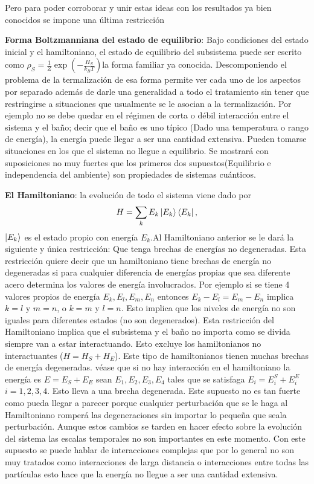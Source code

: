 Pero para poder corroborar y unir estas ideas con los resultados ya bien conocidos se impone una última restricción

\textbf{Forma Boltzmanniana del estado de equilibrio}: Bajo condiciones del estado inicial y el hamiltoniano, el estado de equilibrio del subsistema puede ser escrito como $\rho_{S}= \frac{1}{Z} \exp(-\frac{H_{S}}{k_{B}T})$la forma familiar ya conocida.
Descomponiendo el problema de la termalización de esa forma permite ver cada uno de los aspectos por separado además de darle una generalidad a todo el tratamiento sin tener que restringirse a situaciones que usualmente se le asocian a la termalización. Por ejemplo no se debe quedar en el régimen de corta o débil interacción entre el sistema y el baño; decir que el baño es uno típico (Dado una temperatura o rango de energía), la energía puede llegar a ser una cantidad extensiva. Pueden tomarse situaciones en los que el sistema no llegue a equilibrio.
Se mostrará con suposiciones no muy fuertes que los primeros dos supuestos(Equilibrio e independencia del ambiente) son propiedades de sistemas cuánticos.



\textbf{El Hamiltoniano}: la evolución de todo el sistema viene dado por 
\begin{equation}
H= \sum_{k} E_{k} \ket{E_{k}} \bra{E_{k}},
\end{equation}
$\ket{E_{k}}$ es el estado propio con energía $E_{k}$.Al Hamiltoniano anterior se le dará la siguiente y única restricción: Que tenga brechas de energías no degeneradas. Esta restricción quiere decir que  un hamiltoniano tiene brechas de energía no degeneradas si para cualquier diferencia de energías propias que sea diferente acero determina los valores de energía involucrados. Por ejemplo si se tiene 4 valores propios de energía $E_{k}, E_{l},E_{m},E_{n}$ entonces $E_{k}-E_{l}=E_{m}-E_{n} $ implica $k=l$ y $m=n$, o $k=m$ y $l=n$. Esto implica que los niveles de energía no son iguales para diferentes estados (no son degenerados).
Esta restricción del Hamiltoniano implica que el subsistema y el baño no importa como se divida siempre van a estar interactuando. Esto excluye los hamiltonianos no interactuantes ($H=H_{S}+H_{E}$). Este tipo de hamiltonianos tienen muchas brechas de energía degeneradas. véase que si no hay interacción en el hamiltoniano la energía es $E=E_{S}+E_{E}$ sean $E_{1},E_{2},E_{3},E_{4}$ tales que se satisfaga $E_{i}=E_{i}^{S}+E_{i}^{E}$ $i=1,2,3,4$. Esto lleva a una brecha degenerada. Este supuesto no es tan fuerte como pueda llegar a parecer porque cualquier perturbación que se le haga al Hamiltoniano romperá las degeneraciones sin importar lo pequeña que seala perturbación. Aunque estos cambios se tarden en hacer efecto sobre la evolución del sistema las escalas temporales no son importantes en este momento. Con este supuesto se puede hablar de interacciones complejas que por lo general no son muy tratados como interacciones de larga distancia o interacciones entre todas las partículas esto hace que la energía no llegue a ser una cantidad extensiva.

